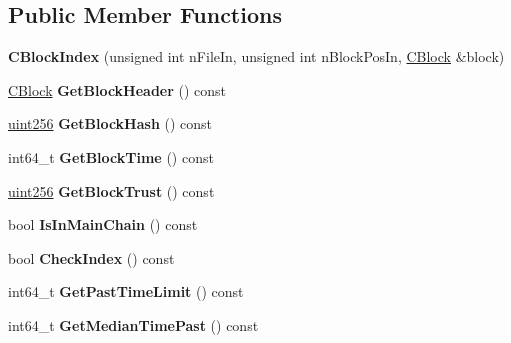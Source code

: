 \subsection*{Public Member Functions}
\begin{DoxyCompactItemize}
\item 
\mbox{\label{class_c_block_index_a59e8716601432cd20856d45bc2f10633}} 
{\bfseries C\+Block\+Index} (unsigned int n\+File\+In, unsigned int n\+Block\+Pos\+In, \mbox{\hyperlink{class_c_block}{C\+Block}} \&block)
\item 
\mbox{\label{class_c_block_index_a476a76d3aec550ca8bc0c85450d93246}} 
\mbox{\hyperlink{class_c_block}{C\+Block}} {\bfseries Get\+Block\+Header} () const
\item 
\mbox{\label{class_c_block_index_a98490a2788c65cdd6ae9002b004dd74c}} 
\mbox{\hyperlink{classuint256}{uint256}} {\bfseries Get\+Block\+Hash} () const
\item 
\mbox{\label{class_c_block_index_a9fe0d4463c07c466f66252e8eec25f5c}} 
int64\+\_\+t {\bfseries Get\+Block\+Time} () const
\item 
\mbox{\label{class_c_block_index_a59372ec3586ce89140acf3affc6e1f70}} 
\mbox{\hyperlink{classuint256}{uint256}} {\bfseries Get\+Block\+Trust} () const
\item 
\mbox{\label{class_c_block_index_af4f055accf83016b226fd969e4de8fd7}} 
bool {\bfseries Is\+In\+Main\+Chain} () const
\item 
\mbox{\label{class_c_block_index_a0e48b62aaeb3075b6d86e96639562ef4}} 
bool {\bfseries Check\+Index} () const
\item 
\mbox{\label{class_c_block_index_a40f52adc1db18cd86dfbfa408402a4ff}} 
int64\+\_\+t {\bfseries Get\+Past\+Time\+Limit} () const
\item 
\mbox{\label{class_c_block_index_aa9bd0ab02cf8b9c866618cee3a5a0583}} 
int64\+\_\+t {\bfseries Get\+Median\+Time\+Past} () const
\item 

\end{DoxyCompactItemize}
